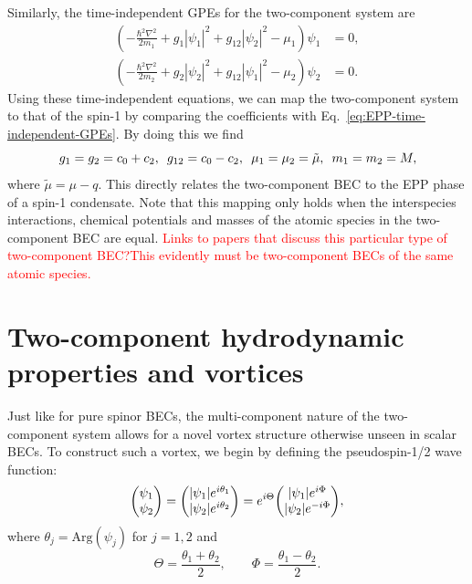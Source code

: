 Similarly, the time-independent GPEs for the two-component system are
\begin{equation}
    \begin{aligned}
        \left(-\frac{\hbar^2\nabla^2}{2m_1} + g_1|\psi_1|^2
        +g_{12}|\psi_2|^2 - \mu_1\right)\psi_1 &= 0, \\
        \left(-\frac{\hbar^2\nabla^2}{2m_2} + g_2|\psi_2|^2
        +g_{12}|\psi_1|^2 - \mu_2\right)\psi_2 &= 0.
    \end{aligned}
    \label{eq:two-comp-time-independent-gpes}
\end{equation}
Using these time-independent equations, we can map the two-component system
to that of the spin-1 by comparing the coefficients with
Eq.~\eqref{eq:EPP-time-independent-GPEs}.
By doing this we find
\begin{equation}
    g_1=g_2=c_0+c_2, \enskip g_{12} = c_0-c_2, \enskip \mu_1=\mu_2=\tilde{\mu}, 
    \enskip m_1=m_2=M,
\end{equation}
where \( \tilde{\mu} = \mu - q \).
This directly relates the two-component BEC to the EPP phase of a spin-1
condensate.
Note that this mapping only holds when the interspecies interactions, chemical
potentials and masses of the atomic species in the two-component BEC are equal.
\textcolor{red}{Links to papers that discuss this particular type of
two-component BEC?\@ This evidently must be two-component BECs of the same atomic
species.}


\section{Two-component hydrodynamic properties and vortices}
Just like for pure spinor BECs, the multi-component nature of the two-component
system allows for a novel vortex structure otherwise unseen in scalar BECs.
To construct such a vortex, we begin by defining the pseudospin-1/2
wave function:
\begin{equation}
    \mqty(\psi_1 \\ \psi_2) = 
    \mqty(|\psi_1|e^{i\theta_1} \\ |\psi_2|e^{i\theta_2}) = 
    e^{i\Theta}\mqty(|\psi_1|e^{i\Phi} \\ |\psi_2|e^{-i\Phi}),
    \label{eq: pseudospin-1/2-wavefunction}  
\end{equation}
where \( \theta_j=\mathrm{Arg}(\psi_j) \) for \( j=1,2 \) and
\begin{equation}\label{eq: Theta-Phi}
    \Theta = \frac{\theta_1 + \theta_2}{2}, \qquad 
    \Phi = \frac{\theta_1 - \theta_2}{2}.
\end{equation}

